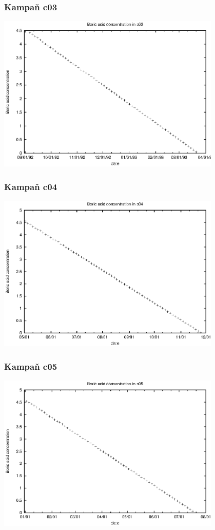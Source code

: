 \documentclass[a4paper,twoside,11pt]{article}
\begin{document}
\subsubsection{Kampaň c03}
\begin{center}
\includegraphics[width=0.8\textwidth]{data_c03_bc.eps}
\end{center}


\subsubsection{Kampaň c04}
\begin{center}
\includegraphics[width=0.8\textwidth]{data_c04_bc.eps}
\end{center}


\subsubsection{Kampaň c05}
\begin{center}
\includegraphics[width=0.8\textwidth]{data_c05_bc.eps}
\end{center}
\end{document}
